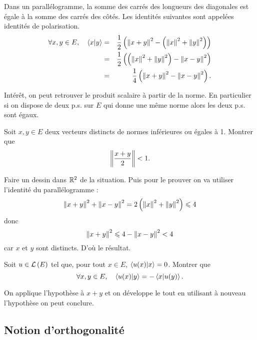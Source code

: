 \documentclass{magnolia}
\begin{document}
\begin{remarques}
\remarque Dans un parallélogramme, la somme des carrés des longueurs des
  diagonales est égale à la somme des carrés des côtés.
\remarque Les identités suivantes sont appelées identités de polarisation.
  \begin{eqnarray*}
  \forall x,y\in E ,\quad \left\langle {x}\middle|{y}\right\rangle
  &=& \frac{1}{2}\left(\left\|x+y\right\|^2-\left(\left\|x\right\|^2+\left\|y\right\|^2\right)\right)\\
  &=& \frac{1}{2}\left(\left(\left\|x\right\|^2+\left\|y\right\|^2\right)-\left\|x-y\right\|^2\right)\\
  &=& \frac{1}{4}\left(\left\|x+y\right\|^2-\left\|x-y\right\|^2\right).
  \end{eqnarray*}
\end{remarques}
\begin{sol} Intérêt, on peut retrouver le produit scalaire à partir de la norme. En particulier si on dispose de deux p.s. sur $E$ qui donne une même norme alors les deux p.s. sont égaux.
\end{sol}

\begin{exos}
\exo Soit $x,y\in E$ deux vecteurs distincts de normes inférieures ou égales
  à 1. Montrer que
  \[\left\|\frac{x+y}{2}\right\|<1.\]
  \begin{sol}
  Faire un dessin dans $\mathbb{R}^2$ de la situation. Puis pour le prouver on va utiliser l'identité du parallélogramme :
  $$\left\|x+y\right\|^2+\left\|x-y\right\|^2=
  2\left(\left\|x\right\|^2+\left\|y\right\|^2\right)\leqslant 4$$ donc $$\left\|x+y\right\|^2\leqslant 4-\left\|x-y\right\|^2<4$$ car $x$ et $y$ sont distincts. D'où le résultat.
  \end{sol}
\exo Soit $u\in\mathcal{L}\left(E\right)$ tel que, pour tout $x\in E$, $\left\langle {u(x)}\middle|{x}\right\rangle=0$.
  Montrer que
  \[\forall x,y\in E ,\quad \left\langle {u(x)}\middle|{y}\right\rangle=-\left\langle {x}\middle|{u(y)}\right\rangle.\]
  \begin{sol} On applique l'hypothèse à $x+y$ et on développe le tout en utilisant à nouveau l'hypothèse on peut conclure.
  \end{sol}
\end{exos}

\subsection{Notion d'orthogonalité}
\end{document}
